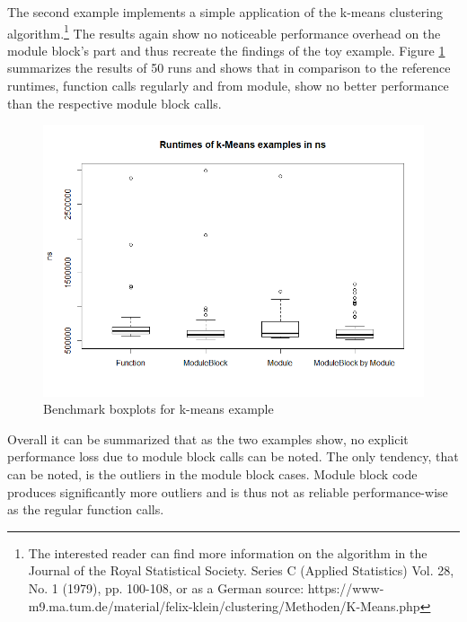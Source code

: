 The second example implements a simple application of the k-means clustering algorithm.\footnote{The interested reader can find more information on the algorithm in the Journal of the Royal Statistical Society. Series C (Applied Statistics) Vol. 28, No. 1 (1979), pp. 100-108, or as a German source:  https://www-m9.ma.tum.de/material/felix-klein/clustering/Methoden/K-Means.php} The results again show no noticeable performance overhead on the module block's part and thus recreate the findings of the toy example. Figure \ref{fig:bKMeans} summarizes the results of 50 runs and shows that in comparison to the reference runtimes, function calls regularly and from module, show no better performance than the respective module block calls.

\begin{figure}[h!]
    \centering
    \includegraphics[scale=0.7]{figures/runtimesKMeansBoxplot.png}
    \caption{Benchmark boxplots for k-means example}
    \label{fig:bKMeans}
\end{figure}

Overall it can be summarized that as the two examples show, no explicit performance loss due to module block calls can be noted. The only tendency, that can be noted, is the outliers in the module block cases. Module block code produces significantly more outliers and is thus not as reliable performance-wise as the regular function calls. 